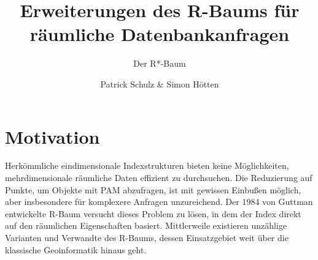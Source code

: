 \documentclass[runningheads,a4paper]{llncs}
\begin{document}
\mainmatter  %

\title{Erweiterungen des R-Baums für räumliche Datenbankanfragen}

\subtitle{Der R*-Baum}


\author{Patrick Schulz \& Simon Hötten}


\maketitle




\section{Motivation} %
\label{sec:intro}

	Herkömmliche eindimensionale Indexstrukturen bieten keine Möglichkeiten, mehrdimensionale räumliche Daten effizient zu durchsuchen. Die Reduzierung auf Punkte, um Objekte mit \ac{PAM} abzufragen, ist mit gewissen Einbußen möglich, aber insbesondere für komplexere Anfragen unzureichend.
	Der 1984 von Guttman entwickelte R-Baum \citep{Guttman:1984} versucht dieses Problem zu lösen, in dem der Index direkt auf den räumlichen Eigenschaften basiert. Mittlerweile existieren unzählige Varianten und Verwandte des R-Baums, dessen Einsatzgebiet weit über die klassische Geoinformatik hinaus geht.
\end{document}
